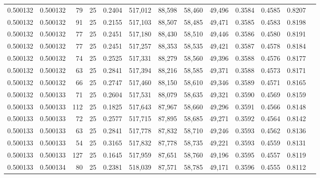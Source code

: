 \begin{tabular}{rrrrrrrrrrrrr}
0.500132 & 0.500132 &    79 &  25 &                                     0.2404 & 517,012 &  88,598 &  58,460 &  49,496 & 0.3584 & 0.4585 & 0.8207 \\
0.500132 & 0.500132 &    91 &  25 &                                     0.2155 & 517,103 &  88,507 &  58,485 &  49,471 & 0.3585 & 0.4583 & 0.8198 \\
0.500132 & 0.500132 &    77 &  25 &                                     0.2451 & 517,180 &  88,430 &  58,510 &  49,446 & 0.3586 & 0.4580 & 0.8191 \\
0.500132 & 0.500132 &    77 &  25 &                                     0.2451 & 517,257 &  88,353 &  58,535 &  49,421 & 0.3587 & 0.4578 & 0.8184 \\
0.500132 & 0.500132 &    74 &  25 &                                     0.2525 & 517,331 &  88,279 &  58,560 &  49,396 & 0.3588 & 0.4576 & 0.8177 \\
0.500132 & 0.500132 &    63 &  25 &                                     0.2841 & 517,394 &  88,216 &  58,585 &  49,371 & 0.3588 & 0.4573 & 0.8171 \\
0.500132 & 0.500132 &    66 &  25 &                                     0.2747 & 517,460 &  88,150 &  58,610 &  49,346 & 0.3589 & 0.4571 & 0.8165 \\
0.500132 & 0.500133 &    71 &  25 &                                     0.2604 & 517,531 &  88,079 &  58,635 &  49,321 & 0.3590 & 0.4569 & 0.8159 \\
0.500133 & 0.500133 &   112 &  25 &                                     0.1825 & 517,643 &  87,967 &  58,660 &  49,296 & 0.3591 & 0.4566 & 0.8148 \\
0.500133 & 0.500133 &    72 &  25 &                                     0.2577 & 517,715 &  87,895 &  58,685 &  49,271 & 0.3592 & 0.4564 & 0.8142 \\
0.500133 & 0.500133 &    63 &  25 &                                     0.2841 & 517,778 &  87,832 &  58,710 &  49,246 & 0.3593 & 0.4562 & 0.8136 \\
0.500133 & 0.500133 &    54 &  25 &                                     0.3165 & 517,832 &  87,778 &  58,735 &  49,221 & 0.3593 & 0.4559 & 0.8131 \\
0.500133 & 0.500133 &   127 &  25 &                                     0.1645 & 517,959 &  87,651 &  58,760 &  49,196 & 0.3595 & 0.4557 & 0.8119 \\
0.500133 & 0.500134 &    80 &  25 &                                     0.2381 & 518,039 &  87,571 &  58,785 &  49,171 & 0.3596 & 0.4555 & 0.8112 \\

\end{tabular}
